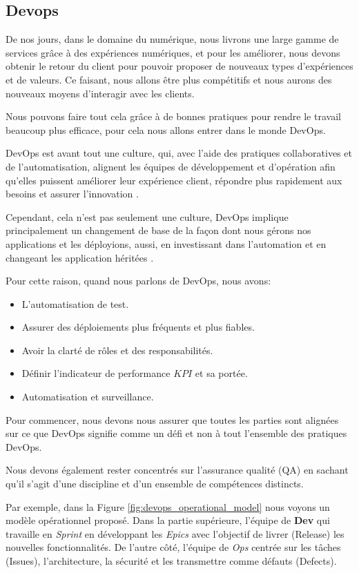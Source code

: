 \subsection{Devops}\label{sec:devops}
De nos jours, dans le domaine du numérique, nous livrons une large gamme de services grâce à des expériences numériques, et pour les améliorer, nous devons obtenir le retour du client pour pouvoir proposer de nouveaux types d’expériences et de valeurs. Ce faisant, nous allons être plus compétitifs et nous aurons des nouveaux moyens d'interagir avec les clients.

Nous pouvons faire tout cela grâce à de bonnes pratiques pour rendre le travail beaucoup plus efficace, pour cela nous allons entrer dans le monde DevOps.

DevOps est avant tout une culture, qui, avec l'aide des pratiques collaboratives et de l'automatisation, alignent les équipes de développement et d'opération afin qu'elles puissent améliorer leur expérience client, répondre plus rapidement aux besoins et assurer l'innovation \cite{IsaacSacolick2016DrivingCulture}.

Cependant, cela n'est pas seulement une culture, DevOps implique principalement un changement de base de la façon dont nous gérons nos applications et les déployions, aussi, en investissant dans l'automation et en changeant les application héritées \cite{benjamin_wootton}.

Pour cette raison, quand nous parlons de DevOps, nous avons:

\begin{itemize}
\item L'automatisation de test.
\item Assurer des déploiements plus fréquents et plus fiables.
\item Avoir la clarté de rôles et des responsabilités.
\item Définir l'indicateur de performance \(KPI\) et sa portée.
\item Automatisation et surveillance.
\end{itemize}

Pour commencer, nous devons nous assurer que toutes les parties sont alignées sur ce que DevOps signifie comme un défi et non à tout l’ensemble des pratiques DevOps.

Nous devons également rester concentrés sur l’assurance qualité (QA) en sachant qu’il s’agit d’une discipline et d’un ensemble de compétences distincts.

Par exemple, dans la Figure \ref{fig:devops_operational_model} nous voyons un modèle opérationnel proposé. Dans la partie supérieure, l'équipe de \textbf{Dev} qui travaille en \textit{Sprint} en développant les \textit{Epics} avec l'objectif de livrer (Release) les nouvelles fonctionnalités. De l'autre côté, l'équipe de \textit{Ops} centrée sur les tâches (Issues), l'architecture, la sécurité et les transmettre comme défauts (Defects).


